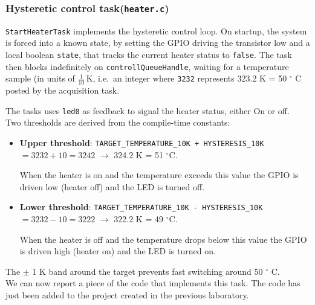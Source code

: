 \documentclass[../main.tex]{subfiles}
\begin{document}
\subsubsection*{Hysteretic control task(\texttt{heater.c})}

\texttt{StartHeaterTask} implements the hysteretic control loop. On startup, the system is forced into a known state, by setting the GPIO driving the transistor low and a local boolean \texttt{state}, that tracks the current heater status to \texttt{false}.
 The task then blocks indefinitely on \texttt{controllQueueHandle}, waiting for a temperature sample (in units of $\frac{1}{10}$\,K, i.e.\ an integer where \texttt{3232} represents 323.2 K = 50 $^\circ$ C posted by the acquisition task.

The tasks uses \texttt{led0} as feedback to signal the heater status, either On or off.\\

Two thresholds are derived from the compile-time constants:

\begin{itemize}
    \item \textbf{Upper threshold}: \texttt{TARGET\_TEMPERATURE\_10K + HYSTERESIS\_10K}
          $ = 3232 + 10 = 3242$ $\rightarrow$ 324.2 K = 51 $^\circ$C.
          
          When the heater is on and the temperature exceeds this value the
          GPIO is driven low (heater off) and the LED is turned off.
    \item \textbf{Lower threshold}: \texttt{TARGET\_TEMPERATURE\_10K - HYSTERESIS\_10K}
          $= 3232 - 10 = 3222$ $\rightarrow$ 322.2 K = 49 $^\circ$C.
          
          When the heater is off and the temperature drops below this value
          the GPIO is driven high (heater on) and the LED is turned on.
          
\end{itemize}

The $\pm$ 1 K band around the target prevents fast
switching around 50 $^\circ$ C.\\

We can now report a piece of the code that implements this task. The code has just been added to the project created in the previous laboratory.\\
\end{document}

